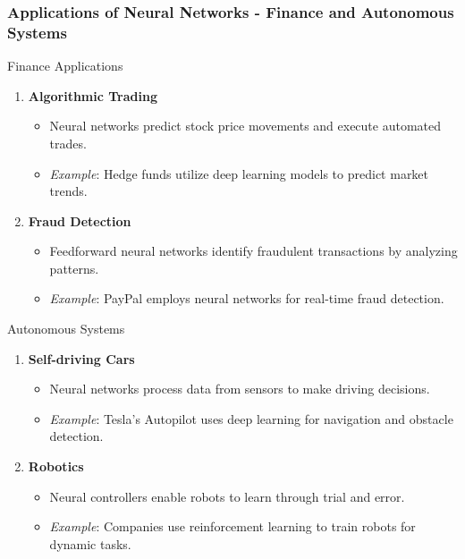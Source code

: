 \documentclass[aspectratio=169]{beamer}
\begin{document}
\begin{frame}[fragile]
    \frametitle{Applications of Neural Networks - Finance and Autonomous Systems}
    \begin{block}{Finance Applications}
        \begin{enumerate}
            \item \textbf{Algorithmic Trading}
            \begin{itemize}
                \item Neural networks predict stock price movements and execute automated trades.
                \item \textit{Example}: Hedge funds utilize deep learning models to predict market trends.
            \end{itemize}
            \item \textbf{Fraud Detection}
            \begin{itemize}
                \item Feedforward neural networks identify fraudulent transactions by analyzing patterns.
                \item \textit{Example}: PayPal employs neural networks for real-time fraud detection.
            \end{itemize}
        \end{enumerate}
    \end{block}
    
    \begin{block}{Autonomous Systems}
        \begin{enumerate}
            \item \textbf{Self-driving Cars}
            \begin{itemize}
                \item Neural networks process data from sensors to make driving decisions.
                \item \textit{Example}: Tesla's Autopilot uses deep learning for navigation and obstacle detection.
            \end{itemize}
            \item \textbf{Robotics}
            \begin{itemize}
                \item Neural controllers enable robots to learn through trial and error.
                \item \textit{Example}: Companies use reinforcement learning to train robots for dynamic tasks.
            \end{itemize}
        \end{enumerate}
    \end{block}
\end{frame}
\end{document}
